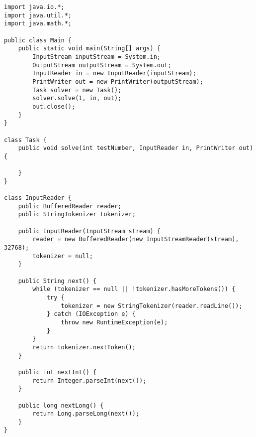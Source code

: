 \begin{lstlisting}
import java.io.*;
import java.util.*;
import java.math.*;

public class Main {
	public static void main(String[] args) {
		InputStream inputStream = System.in;
		OutputStream outputStream = System.out;
		InputReader in = new InputReader(inputStream);
		PrintWriter out = new PrintWriter(outputStream);
		Task solver = new Task();
		solver.solve(1, in, out);
		out.close();
	}
}

class Task {
	public void solve(int testNumber, InputReader in, PrintWriter out) {
		
	}
}

class InputReader {
	public BufferedReader reader;
	public StringTokenizer tokenizer;
	
	public InputReader(InputStream stream) {
		reader = new BufferedReader(new InputStreamReader(stream), 32768);
		tokenizer = null;
	}
	
	public String next() {
		while (tokenizer == null || !tokenizer.hasMoreTokens()) {
			try {
				tokenizer = new StringTokenizer(reader.readLine());
			} catch (IOException e) {
				throw new RuntimeException(e);
			}
		}
		return tokenizer.nextToken();
	}
	
	public int nextInt() {
		return Integer.parseInt(next());
	}
	
	public long nextLong() {
		return Long.parseLong(next());
	}
}
\end{lstlisting}

